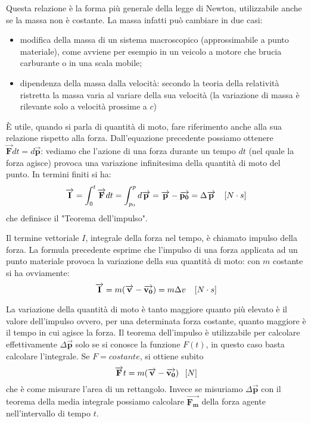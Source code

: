 \documentclass[class=book, crop=false, oneside, 12pt]{standalone}
\begin{document}
Questa relazione è la forma più generale della legge di Newton, utilizzabile anche se la massa non è costante. 
La massa infatti può cambiare in due casi:
\begin{itemize}
    \item modifica della massa di un sistema macroscopico (approssimabile a punto materiale), come avviene per esempio in un veicolo a motore che brucia carburante o in una scala mobile; 
    \item dipendenza della massa dalla velocità: secondo la teoria della relatività ristretta la massa varia al variare della sua velocità (la variazione di massa è rilevante solo a velocità prossime a \(c\))
\end{itemize}

È utile, quando si parla di quantità di moto, fare riferimento anche alla sua relazione rispetto alla forza.
Dall'equazione precedente possiamo ottenere \(\overrightarrow{\mathbf{F}} d t = d \overrightarrow{\mathbf{p}}\): vediamo che l'azione di una forza durante un tempo \(d t\) (nel quale la forza agisce) provoca una variazione infinitesima della quantità di moto del punto. 
In termini finiti si ha:
\begin{equation}
    \overrightarrow{\mathbf{I}} = \int_0^t \overrightarrow{\mathbf{F}} dt = \int_{p_0}^p d \overrightarrow{\mathbf{p}} = \overrightarrow{\mathbf{p}}-\overrightarrow{\mathbf{p_0}} = \Delta \overrightarrow{\mathbf{p}} \ \udm{N \cdot s}
\end{equation} che definisce il "Teorema dell'impulso".

Il termine vettoriale \(I\), integrale della forza nel tempo, è chiamato impulso della forza. 
La formula precedente esprime che l'impulso di una forza applicata ad un punto materiale provoca la variazione della sua quantità di moto: con \(m\) costante si ha ovviamente:
\begin{equation}
    \overrightarrow{\mathbf{I}} = m (\overrightarrow{\mathbf{v}} - \overrightarrow{\mathbf{v_0}}) = m \Delta v \ \udm{N \cdot s}
\end{equation}

La variazione della quantità di moto è tanto maggiore quanto più elevato è il valore dell'impulso ovvero, per una determinata forza costante, quanto maggiore è il tempo in cui agisce la forza.
Il teorema dell'impulso è utilizzabile per calcolare effettivamente \(\Delta \overrightarrow{\mathbf{p}}\) solo se si conosce la funzione \(F (t)\), in questo caso basta calcolare l'integrale.
Se \(F = costante\), si ottiene subito
\begin{equation*}
    \overrightarrow{\mathbf{F}} t = m (\overrightarrow{\mathbf{v}} - \overrightarrow{\mathbf{v_0}}) \udm{N}
\end{equation*}
che è come misurare l'area di un rettangolo.
Invece se misuriamo \(\Delta \overrightarrow{\mathbf{p}}\) con il teorema della media integrale possiamo calcolare \(\overrightarrow{\mathbf{F_m}}\) della forza agente nell'intervallo di tempo \(t\).
\end{document}
